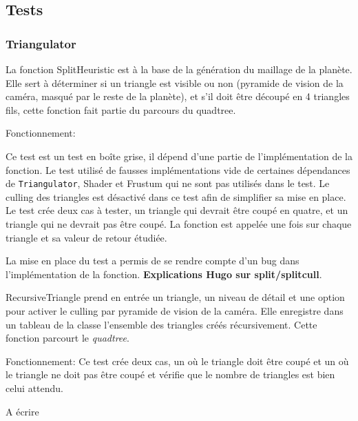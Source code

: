 \subsection{Tests}

\subsubsection{Triangulator}


La fonction SplitHeuristic est à la base de la génération du maillage de
la planète. Elle sert à déterminer si un triangle est visible ou non
(pyramide de vision de la caméra, masqué par le reste de la planète), et
s'il doit être découpé en 4 triangles fils, cette fonction fait partie
du parcours du quadtree.

Fonctionnement:

Ce test est un test en boîte grise, il dépend d'une partie de
l'implémentation de la fonction. Le test utilisé de fausses
implémentations vide de certaines dépendances de \texttt{Triangulator},
Shader et Frustum qui ne sont pas utilisés dans le test. Le culling des
triangles est désactivé dans ce test afin de simplifier sa mise en
place. Le test crée deux cas à tester, un triangle qui devrait être
coupé en quatre, et un triangle qui ne devrait pas être coupé. La
fonction est appelée une fois sur chaque triangle et sa valeur de retour
étudiée.

La mise en place du test a permis de se rendre compte d'un bug dans
l'implémentation de la fonction. \textbf{Explications Hugo sur
split/splitcull}.

\label{recursivetriangle}

RecursiveTriangle prend en entrée un triangle, un niveau de détail et
une option pour activer le culling par pyramide de vision de la caméra.
Elle enregistre dans un tableau de la classe l'ensemble des triangles
créés récursivement. Cette fonction parcourt le \emph{quadtree}.

Fonctionnement: Ce test crée deux cas, un où le triangle doit être coupé
et un où le triangle ne doit pas être coupé et vérifie que le nombre de
triangles est bien celui attendu.

\label{triangulatorgenerategeometry}

A écrire

\label{textrendererupdatebuffer}

